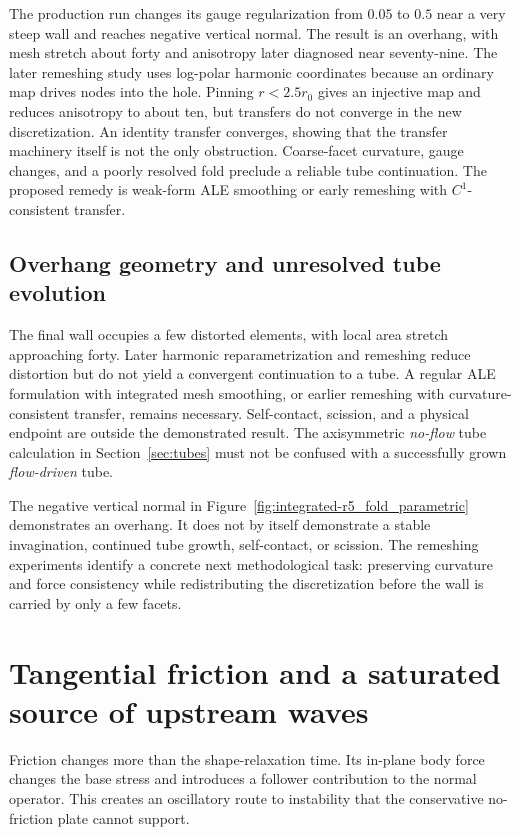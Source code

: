 The production run changes its gauge regularization from $0.05$ to $0.5$ near a very steep wall and reaches negative vertical normal. The result is an overhang, with mesh stretch about forty and anisotropy later diagnosed near seventy-nine. The later remeshing study uses log-polar harmonic coordinates because an ordinary map drives nodes into the hole. Pinning $r<2.5r_0$ gives an injective map and reduces anisotropy to about ten, but transfers do not converge in the new discretization. An identity transfer converges, showing that the transfer machinery itself is not the only obstruction. Coarse-facet curvature, gauge changes, and a poorly resolved fold preclude a reliable tube continuation. The proposed remedy is weak-form ALE smoothing or early remeshing with $C^1$-consistent transfer.


\subsection{Overhang geometry and unresolved tube evolution}


The final wall occupies a few distorted elements, with local area stretch approaching forty. Later harmonic reparametrization and remeshing reduce distortion but do not yield a convergent continuation to a tube. A regular ALE formulation with integrated mesh smoothing, or earlier remeshing with curvature-consistent transfer, remains necessary. Self-contact, scission, and a physical endpoint are outside the demonstrated result. The axisymmetric \emph{no-flow} tube calculation in Section~\ref{sec:tubes} must not be confused with a successfully grown \emph{flow-driven} tube.


The negative vertical normal in Figure~\ref{fig:integrated-r5_fold_parametric} demonstrates an overhang. It does not by itself demonstrate a stable invagination, continued tube growth, self-contact, or scission. The remeshing experiments identify a concrete next methodological task: preserving curvature and force consistency while redistributing the discretization before the wall is carried by only a few facets.


\section{Tangential friction and a saturated source of upstream waves}\label{sec:flutter}
Friction changes more than the shape-relaxation time. Its in-plane body force changes the base stress and introduces a follower contribution to the normal operator. This creates an oscillatory route to instability that the conservative no-friction plate cannot support.


